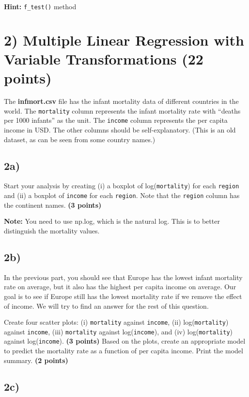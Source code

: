 \documentclass[
  letterpaper,
  DIV=11,
  numbers=noendperiod]{scrreprt}
\begin{document}
\textbf{Hint:} \texttt{f\_test()} method

\section{2) Multiple Linear Regression with Variable Transformations (22
points)}\label{multiple-linear-regression-with-variable-transformations-22-points}

The \textbf{infmort.csv} file has the infant mortality data of different
countries in the world. The \texttt{mortality} column represents the
infant mortality rate with ``deaths per 1000 infants'' as the unit. The
\texttt{income} column represents the per capita income in USD. The
other columns should be self-explanatory. (This is an old dataset, as
can be seen from some country names.)

\subsection{2a)}\label{a-6}

Start your analysis by creating (i) a boxplot of log(\texttt{mortality})
for each \texttt{region} and (ii) a boxplot of \texttt{income} for each
\texttt{region}. Note that the \texttt{region} column has the continent
names. \textbf{(3 points)}

\textbf{Note:} You need to use np.log, which is the natural log. This is
to better distinguish the mortality values.

\subsection{2b)}\label{b-6}

In the previous part, you should see that Europe has the lowest infant
mortality rate on average, but it also has the highest per capita income
on average. Our goal is to see if Europe still has the lowest mortality
rate if we remove the effect of income. We will try to find an answer
for the rest of this question.

Create four scatter plots: (i) \texttt{mortality} against
\texttt{income}, (ii) log(\texttt{mortality}) against \texttt{income},
(iii) \texttt{mortality} against log(\texttt{income}), and (iv)
log(\texttt{mortality}) against log(\texttt{income}). \textbf{(3
points)} Based on the plots, create an appropriate model to predict the
mortality rate as a function of per capita income. Print the model
summary. \textbf{(2 points)}

\subsection{2c)}\label{c-4}
\end{document}
